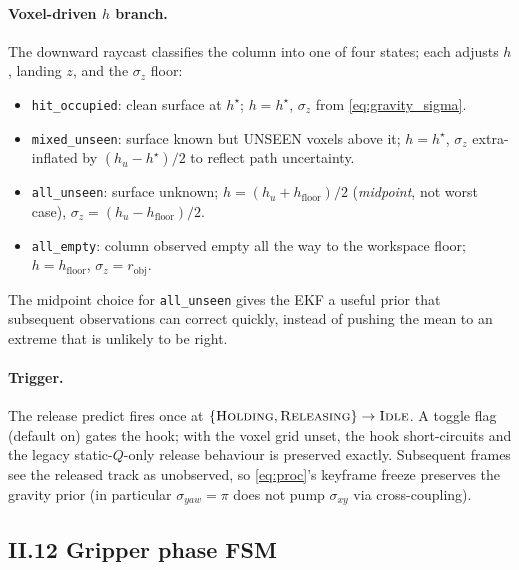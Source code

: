 \documentclass[11pt]{article}
\begin{document}
\paragraph{Voxel-driven $h$ branch.}
The downward raycast classifies the column into one of four states; each
adjusts $h$, landing $z$, and the $\sigma_z$ floor:
\begin{itemize}[leftmargin=1.5em,itemsep=0pt,topsep=2pt]
\item \texttt{hit\_occupied}: clean surface at $h^\star$;
  $h = h^\star$, $\sigma_z$ from \eqref{eq:gravity_sigma}.
\item \texttt{mixed\_unseen}: surface known but UNSEEN voxels above it;
  $h = h^\star$, $\sigma_z$ extra-inflated by $(h_u - h^\star)/2$ to reflect
  path uncertainty.
\item \texttt{all\_unseen}: surface unknown; $h = (h_u + h_{\text{floor}})/2$
  (\emph{midpoint}, not worst case), $\sigma_z = (h_u - h_{\text{floor}})/2$.
\item \texttt{all\_empty}: column observed empty all the way to the
  workspace floor; $h = h_{\text{floor}}$, $\sigma_z = r_{\text{obj}}$.
\end{itemize}
The midpoint choice for \texttt{all\_unseen} gives the EKF a useful prior
that subsequent observations can correct quickly, instead of pushing the
mean to an extreme that is unlikely to be right.

\paragraph{Trigger.}
The release predict fires once at $\{\textsc{Holding},\textsc{Releasing}\}\to
\textsc{Idle}$. A toggle flag (default on) gates the hook; with the voxel
grid unset, the hook short-circuits and the legacy static-$Q$-only release
behaviour is preserved exactly. Subsequent frames see the released track
as unobserved, so \eqref{eq:proc}'s keyframe freeze preserves the gravity
prior (in particular $\sigma_{yaw}=\pi$ does not pump $\sigma_{xy}$ via
cross-coupling).

\subsection*{II.12 Gripper phase FSM}
\end{document}
